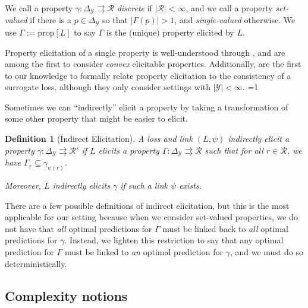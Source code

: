 \documentclass{article}
\newcommand{\Comments}{1}
\newcommand{\mytodo}[2]{\ifnum\Comments=1%
	\todo[linecolor=#1!80!black,backgroundcolor=#1,bordercolor=#1!80!black]{#2}\fi}
\newcommand{\jessiet}[1]{\mytodo{purple!20!white}{JF: #1}}
\newcommand{\simplex}{\Delta_\Y}
\newcommand{\prop}[1]{\mathrm{prop}[#1]}
\newcommand{\R}{\mathcal{R}}
\newcommand{\Y}{\mathcal{Y}}
\newcommand{\toto}{\rightrightarrows}
\newtheorem{definition}{Definition}
\begin{document}
We call a property $\gamma: \simplex \toto \R$ \emph{discrete} if $|\R| < \infty$, and we call a property \emph{set-valued} if there is a $p \in \simplex$ so that $|\Gamma(p)| > 1$, and \emph{single-valued} otherwise.
We use $\Gamma := \prop{L}$ to say $\Gamma$ is the (unique) property elicited by $L$.

Property elicitation of a single property is well-understood through \cite{savage1971elicitation,osband1985information-eliciting,lambert2008eliciting, lambert2009eliciting, lambert2018elicitation}, and \cite{finocchiaro2018convex} are among the first to consider \emph{convex} elicitable properties.
Additionally, \cite{agarwal2015consistent} are the first to our knowledge to formally relate property elicitation to the consistency of a surrogate loss, although they only consider settings with $|\Y| < \infty$. \jessiet{right?}

Sometimes we can ``indirectly'' elicit a property by taking a transformation of some other property that might be easier to elicit.

\begin{definition}[Indirect Elicitation]\label{def:indirectly-elicits}
	A loss and link $(L, \psi)$ \emph{indirectly elicit} a property $\gamma:\simplex \toto \R'$ if $L$ elicits a property $\Gamma: \simplex \toto \R$ such that for all $r \in \R$, we have $\Gamma_r \subseteq \gamma_{\psi(r)}$.
	
	Moreover, $L$ indirectly elicits $\gamma$ if such a link $\psi$ exists.
\end{definition}

There are a few possible definitions of indirect elicitation, but this is the most applicable for our setting because when we consider set-valued properties, we do not have that \emph{all} optimal predictions for $\Gamma$ must be linked back to \emph{all} optimal predictions for $\gamma$.
Instead, we lighten this restriction to say that any optimal prediction for $\Gamma$ must be linked to \emph{an} optimal prediction for $\gamma$, and we must do so deterministically. 


\subsection{Complexity notions}\label{subsec:complexity}
\end{document}
